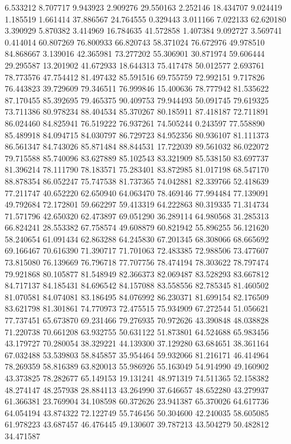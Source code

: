 6.533212
8.707717
9.943923
2.909276
29.550163
2.252146
18.434707
9.024419
1.185519
1.661414
37.886567
24.764555
0.329443
3.011166
7.022133
62.620180
3.390929
5.870382
3.414969
16.784635
41.572858
1.407384
9.092727
3.569741
0.414014
60.807269
76.800933
66.820743
58.371024
76.672976
49.978510
84.868667
3.139016
42.365981
73.277202
55.306901
30.871974
59.606444
29.295587
13.201902
41.672933
18.644313
75.417478
50.012577
2.693761
78.773576
47.754412
81.497432
85.591516
69.755759
72.992151
9.717826
76.443823
39.729609
79.346511
76.999846
15.400636
78.777942
81.535622
87.170455
85.392695
79.465375
90.409753
79.944493
50.091745
79.619325
73.711386
80.978234
88.404534
85.370267
80.185911
87.418187
72.711891
86.024460
84.825941
76.519222
76.937261
74.505244
0.243597
77.558890
85.489918
84.094715
84.030797
86.729723
84.952356
80.936107
81.111373
86.561347
84.743026
85.871484
88.844531
17.722039
89.561032
86.022072
79.715588
85.740096
83.627889
85.102543
83.321909
85.538150
83.697737
81.396214
78.111790
78.183571
75.283401
83.872985
81.017198
68.547170
88.878354
86.052247
75.747538
81.737365
74.042881
82.339766
52.418639
77.211747
40.652220
62.650940
64.063470
78.469146
77.994484
77.139091
49.792684
72.172801
59.662297
59.413319
64.222863
80.319335
71.314734
71.571796
42.650320
62.473897
69.051290
36.289114
64.980568
31.285313
66.824241
28.553382
67.758574
49.608879
60.821942
55.896255
56.121620
58.240654
61.091434
62.863288
64.245830
67.201345
68.308066
68.665692
69.166467
70.616390
71.390717
71.701063
72.483385
72.988506
73.477607
73.815080
76.139669
76.796718
77.707756
78.474194
78.303622
78.797474
79.921868
80.105877
81.548949
82.366373
82.069487
83.528293
83.667812
84.717137
84.185431
84.696542
84.157088
83.558556
82.785345
81.460502
81.070581
84.074081
83.186495
84.076992
86.230371
81.699154
82.176509
83.621798
81.301861
74.770973
72.475515
75.934909
67.272544
51.056621
77.737451
65.673870
69.231466
79.276935
70.972626
43.390848
48.038828
71.220738
70.661208
63.932755
50.631122
51.873801
64.524688
65.983456
43.179727
70.280054
38.329221
44.139300
37.129280
63.684651
38.361164
67.032488
53.539803
58.845857
35.954464
59.932066
81.216171
46.414964
78.269359
58.816389
63.820013
55.986926
55.163049
54.914990
49.160902
43.373825
78.282677
65.149153
19.131241
48.971319
74.511365
52.158382
48.274147
48.257938
28.884113
43.264990
37.646657
48.652280
43.279937
61.366381
23.769904
34.108598
60.372626
23.941387
65.370026
64.617736
64.054194
43.874322
72.122749
55.746456
50.304600
42.240035
58.605085
61.978223
43.687457
46.476445
49.130607
39.787213
43.504279
50.482812
34.471587
